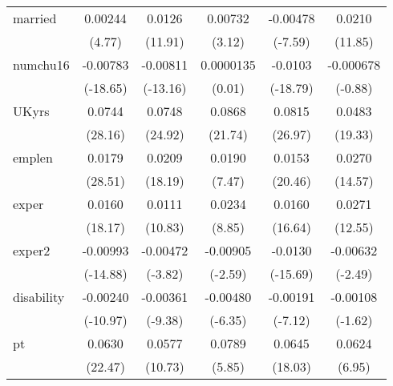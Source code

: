 \begin{table}[htbp]
\begin{tabular}{l*{5}{c}}
married     &     0.00244\sym{***}&      0.0126\sym{***}&     0.00732\sym{**} &    -0.00478\sym{***}&      0.0210\sym{***}\\
            &      (4.77)         &     (11.91)         &      (3.12)         &     (-7.59)         &     (11.85)         \\
numchu16    &    -0.00783\sym{***}&    -0.00811\sym{***}&   0.0000135         &     -0.0103\sym{***}&   -0.000678         \\
            &    (-18.65)         &    (-13.16)         &      (0.01)         &    (-18.79)         &     (-0.88)         \\
UKyrs       &      0.0744\sym{***}&      0.0748\sym{***}&      0.0868\sym{***}&      0.0815\sym{***}&      0.0483\sym{***}\\
            &     (28.16)         &     (24.92)         &     (21.74)         &     (26.97)         &     (19.33)         \\
emplen      &      0.0179\sym{***}&      0.0209\sym{***}&      0.0190\sym{***}&      0.0153\sym{***}&      0.0270\sym{***}\\
            &     (28.51)         &     (18.19)         &      (7.47)         &     (20.46)         &     (14.57)         \\
exper       &      0.0160\sym{***}&      0.0111\sym{***}&      0.0234\sym{***}&      0.0160\sym{***}&      0.0271\sym{***}\\
            &     (18.17)         &     (10.83)         &      (8.85)         &     (16.64)         &     (12.55)         \\
exper2      &    -0.00993\sym{***}&    -0.00472\sym{***}&    -0.00905\sym{**} &     -0.0130\sym{***}&    -0.00632\sym{*}  \\
            &    (-14.88)         &     (-3.82)         &     (-2.59)         &    (-15.69)         &     (-2.49)         \\
disability  &    -0.00240\sym{***}&    -0.00361\sym{***}&    -0.00480\sym{***}&    -0.00191\sym{***}&    -0.00108         \\
            &    (-10.97)         &     (-9.38)         &     (-6.35)         &     (-7.12)         &     (-1.62)         \\
pt          &      0.0630\sym{***}&      0.0577\sym{***}&      0.0789\sym{***}&      0.0645\sym{***}&      0.0624\sym{***}\\
            &     (22.47)         &     (10.73)         &      (5.85)         &     (18.03)         &      (6.95)         \\

\end{tabular}
\end{table}
